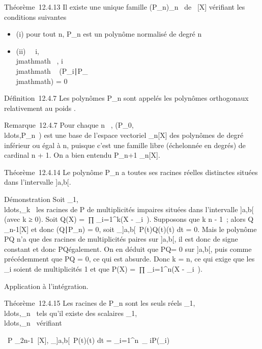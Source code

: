 \documentclass[]{article}
\begin{document}
Théorème~12.4.13 Il existe une unique famille
(P_n)_n\in{}~ de ~{[}X{]} vérifiant les conditions
suivantes

\begin{itemize}
\itemsep1pt\parskip0pt
\item
  (i) pour tout n, P_n est un polynôme normalisé de degré n
\item
  (ii) \forall~~i,\\jmathmath \in {}~,
  i\neq~\\jmathmath \rigtharrow~
  (P_i∣P_\\jmathmath) = 0
\end{itemize}

Définition~12.4.7 Les polynômes P_n sont appelés les polynômes
orthogonaux relativement au poids \omega.

Remarque~12.4.7 Pour chaque n \in {}~,
(P_0,\\ldots,P_n~)
est une base de l'espace vectoriel _n{[}X{]} des polynômes de
degré inférieur ou égal à n, puisque c'est une famille libre (échelonnée
en degrés) de cardinal n + 1. On a bien entendu P_n+1 \bot
{}_n{[}X{]}.

Théorème~12.4.14 Le polynôme P_n a toutes ses racines réelles
distinctes situées dans l'intervalle {]}a,b{[}.

Démonstration Soit
\alpha_1,\\ldots,\alpha_k~
les racines de P de multiplicités impaires situées dans l'intervalle
{]}a,b{[} (avec k ≥ 0). Soit Q(X) =\
∏  _i=1^k(X - \alpha_i~).
Supposons que k \leq n - 1~; alors Q \in {}_n-1{[}X{]} et donc
(Q∣P_n) = 0, soit
\int  _{]}a,b{[}~P(t)Q(t)\omega(t) dt = 0.
Mais le polynôme PQ n'a que des racines de multiplicités paires sur
{]}a,b{[}, il est donc de signe constant et donc PQ\omega également. On en
déduit que PQ\omega = 0 sur {]}a,b{[}, puis comme précédemment que PQ = 0, ce
qui est absurde. Donc k = n, ce qui exige que les \alpha_i soient de
multiplicités 1 et que P(X) =\
∏  _i=1^n(X - \alpha_i~).

Application à l'intégration.

Théorème~12.4.15 Les racines de P_n sont les seuls réels
\alpha_1,\\ldots,\alpha_n~
tels qu'il existe des scalaires
\lambda_1,\\ldots,\lambda_n~
vérifiant

\forall~P \in {}_2n-1~{[}X{]},
\int  _{]}a,b{[}~P(t)\omega(t) dt =
\sum _i=1^n\lambda~_
iP(\alpha_i)
\end{document}
